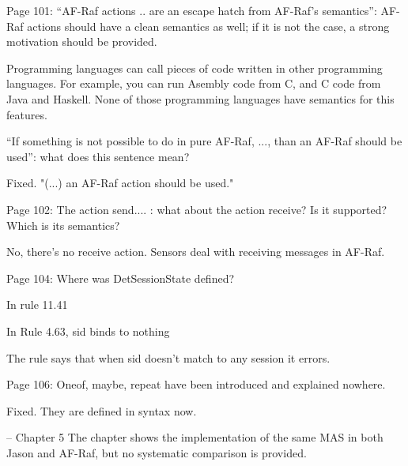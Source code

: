 \documentclass{article}
\newcommand{\todo}[1]{[\textcolor{green}{TODO}: #1]}
\newenvironment{them}{\noindent\begingroup\color{blue}}{\endgroup\par}
\begin{document}
\begin{them}

Page 101:
“AF-Raf actions .. are an escape hatch from AF-Raf's semantics”: AF-Raf actions
should have a clean semantics as well; if it is not the case, a strong
motivation should be provided.

\end{them}
Programming languages can call pieces of code written in other programming
languages. For example, you can run Asembly code from C, and C code from Java
and Haskell. None of those programming languages have semantics for this
features.

\begin{them}

“If something is not possible to do in pure AF-Raf, ..., than an AF-Raf should
be used”: what does this sentence mean?

\end{them}
Fixed. "(...) an AF-Raf action should be used."

\begin{them}

Page 102:
The action send.... : what about the action receive? Is it supported? Which is
its semantics?

\end{them}
No, there's no receive action. Sensors deal with receiving messages in AF-Raf.

\begin{them}

Page 104:
Where was DetSessionState defined?
\end{them}
In rule 11.41

\begin{them}

In Rule 4.63, sid binds to nothing
\end{them}
The rule says that when sid doesn't match to any session it errors.

\begin{them}

Page 106:
Oneof, maybe, repeat have been introduced and explained nowhere.
\end{them}
Fixed. They are defined in syntax now.

\begin{them}

-- Chapter 5
The chapter shows the implementation of the same MAS in both Jason and AF-Raf,
but no systematic comparison is provided.

\end{them}
\todo{}
\end{document}
